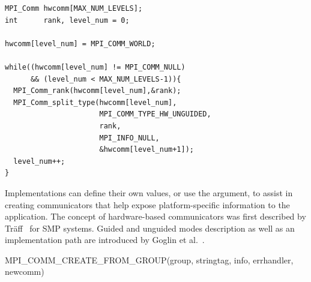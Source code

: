 \begin{description}
\begin{example}
\begin{lstlisting}[language={[MPI]C}]
MPI_Comm hwcomm[MAX_NUM_LEVELS];
int      rank, level_num = 0;

hwcomm[level_num] = MPI_COMM_WORLD;

while((hwcomm[level_num] != MPI_COMM_NULL) 
      && (level_num < MAX_NUM_LEVELS-1)){
  MPI_Comm_rank(hwcomm[level_num],&rank);
  MPI_Comm_split_type(hwcomm[level_num],
                      MPI_COMM_TYPE_HW_UNGUIDED,
                      rank,
                      MPI_INFO_NULL,
                      &hwcomm[level_num+1]);
  level_num++;
}
\end{lstlisting}
  \end{example}
 
\end{description}

\begin{implementors}
  Implementations can define their own  values, or use the  argument, to
  assist in creating communicators that help expose platform-specific information to the application.
  The concept of hardware-based communicators was first described by Tr{\"a}ff~\cite{Traff03:archaware} for SMP systems.
  Guided and unguided modes description as well as an implementation path are introduced by
  Goglin et al.~\cite{hsplit18}.
\end{implementors}

\begin{funcdef}{MPI\_COMM\_CREATE\_FROM\_GROUP}{(\mbox{group}, \mbox{stringtag}, \mbox{info}, \mbox{errhandler}, \mbox{newcomm})}
\end{funcdef}

